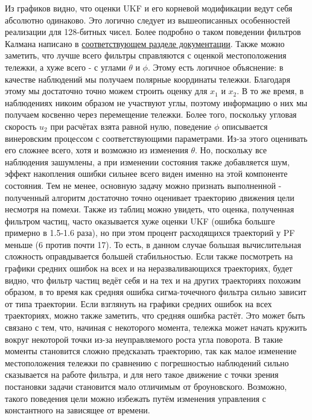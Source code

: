 \documentclass[12pt]{article}
\begin{document}
Из графиков видно, что оценки UKF и его корневой модификации ведут себя абсолютно одинаково. Это логично следует из вышеописанных особенностей реализации для 128-битных чисел. Более подробно о таком поведении фильтров Калмана написано в \href{https://filterpy.readthedocs.io/en/latest/kalman/SquareRootFilter.html}{соответствующем разделе документации}. \newline
Также можно заметить, что лучше всего фильтры справляются с оценкой местоположения тележки, а хуже всего - с углами $\theta$ и $\phi$. Этому есть логичное объяснение: в качестве наблюдений мы получаем полярные координаты тележки. Благодаря этому мы достаточно точно можем строить оценку для $x_1$ и $x_2$. В то же время, в наблюдениях никоим образом не участвуют углы, поэтому информацию о них мы получаем косвенно через перемещение тележки. Более того, поскольку угловая скорость $u_2$ при расчётах взята равной нулю, поведение $\phi$ описывается винеровским процессом с соответствующими параметрами. Из-за этого оценивать его сложнее всего, хотя и возможно из изменения $\theta$. Но, поскольку все наблюдения зашумлены, а при изменении состояния также добавляется шум, эффект накопления ошибки сильнее всего виден именно на этой компоненте состояния. Тем не менее, основную задачу можно признать выполненной - полученный алгоритм достаточно точно оценивает траекторию движения цели несмотря на помехи. Также из таблиц можно увидеть, что оценка, полученная фильтром частиц, часто оказывается хуже оценки UKF (ошибка большге примерно в 1.5-1.6 раза), но при этом процент расходящихся траекторий у PF меньше (6 против почти 17). То есть, в данном случае большая вычислительная сложность оправдывается большей стабильностью. Если также посмотреть на графики средних ошибок на всех и на неразваливающихся траекториях, будет видно, что фильтр частиц ведёт себя и на тех и на других траекториях похожим образом, в то время как средняя ошибка сигма-точечного фильтра сильно зависит от типа траектории. \newline
Если взглянуть на графики средних ошибок на всех траекториях, можно также заметить, что средняя ошибка растёт. Это может быть связано с тем, что, начиная с некоторого момента, тележка может начать кружить вокруг некоторой точки из-за неуправляемого роста угла поворота. В такие моменты становится сложно предсказать траекторию, так как малое изменение местоположения тележки по сравнению с погрешностью наблюдений сильно сказывается на работе фильтра, и для него такое движение с точки зрения постановки задачи становится мало отличимым от броуновского. Возможно, такого поведения цели можно избежать путём изменения управления с константного на зависящее от времени.
\end{document}
